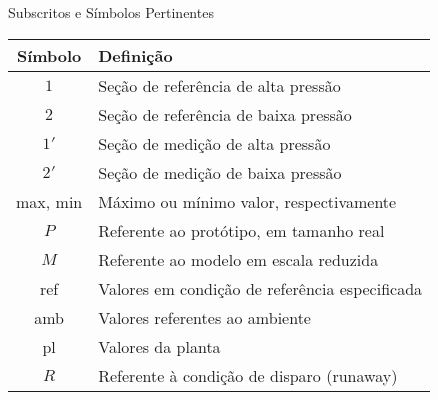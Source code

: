     \begin{frame}{Subscritos e Símbolos Pertinentes}\vspace*{-1em}
        \setlength{\tabcolsep}{2mm}
        \noindent\begin{longtable}{cp{110mm}}
            \alert{Símbolo} & \alert{Definição} \\
            \hline
            $1$ &
            Seção de referência de alta pressão \\
            $2$ &
            Seção de referência de baixa pressão \\
            $1'$ &
            Seção de medição de alta pressão \\
            $2'$ &
            Seção de medição de baixa pressão \\
            \hline
            max, min &
            Máximo ou mínimo valor, respectivamente \\
            $P$ &
            Referente ao \alert{protótipo}, em tamanho real \\
            $M$ &
            Referente ao \alert{modelo} em escala reduzida \\
            ref &
            Valores em condição de referência especificada \\
            amb &
            Valores referentes ao ambiente \\
            pl &
            Valores da planta \\
            $R$ &
            Referente à condição de \alert{disparo} (runaway) \\
            \hline
        \end{longtable}
    \end{frame}

    \begin{frame}\vspace*{0em}
    \end{frame}

